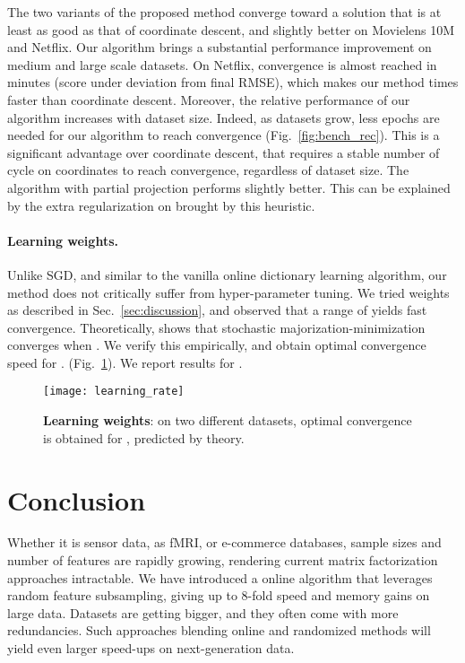 \documentclass{article}
\begin{document}
The two variants of the proposed method
converge toward a solution that is at least as good as that of
coordinate descent, and slightly better on Movielens 10M and Netflix.
Our algorithm brings a substantial performance improvement on medium
and large scale datasets. On Netflix, convergence is almost reached in 
minutes (score under  deviation from final RMSE), which makes our method  times faster than coordinate descent.
Moreover, the relative performance of our algorithm increases with
dataset size. Indeed, as datasets grow,
less epochs are needed for our algorithm to reach convergence (Fig.~\ref{fig:bench_rec}). This is a
significant advantage over coordinate descent, that requires a stable number of
cycle on coordinates to reach convergence, regardless of dataset size.
The algorithm with partial projection performs slightly better. This can be explained by the extra regularization on  brought by this heuristic.

\paragraph{Learning weights.}
Unlike SGD, and similar to the vanilla online dictionary learning algorithm, our method does not
critically suffer from hyper-parameter tuning. We tried weights
 as described in Sec.~\ref{sec:discussion}, and observed that a range of  yields fast convergence.
Theoretically, \citet{mairal_stochastic_2013} shows that stochastic
majorization-minimization converges when . We verify this empirically, and obtain optimal convergence speed for .
(Fig.~\ref{fig:learning_rate}). We report results for .

\begin{figure}[hbt]
\texttt{[image: learning\_rate]}
  \vspace{-.5em}
  \caption{\textbf{Learning weights}:
on two different datasets, optimal convergence is obtained for , predicted by theory.
  \label{fig:learning_rate}}
  \vspace{-.5em}
\end{figure}

\section{Conclusion}

Whether it is sensor data, as fMRI, or e-commerce databases, sample sizes and
number of features are rapidly growing, rendering current matrix
factorization approaches  intractable. We have introduced a online algorithm that leverages
random feature subsampling, giving up to 8-fold speed and memory gains on
large data. Datasets are getting bigger,
and they often come with more redundancies. Such approaches
blending online and randomized methods will yield even larger
speed-ups on next-generation data.
\end{document}

